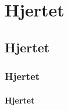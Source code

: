 \section{Hjertet}\cite{Castiglioni2007}
\subsection{Hjertet}\cite{Devices2013}
\subsubsection{Hjertet}\cite{Garcia-gonzalez2013}
\paragraph{Hjertet}\cite{Jain2016}